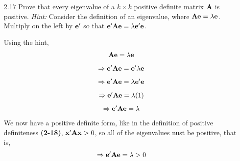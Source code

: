 \begin{enumerate}[font=\bfseries]
        \item[2.17] Prove that every eigenvalue of a $k \times k$ positive definite matrix $\bold{A}$ is positive.
        \newline
        \textit{Hint:} Consider the definition of an eigenvalue, where $\bold{A}\bold{e} = \lambda\bold{e}$. Multiply on the left by
        $\bold{e}^\prime$ so that $\bold{e}^\prime\bold{A}\bold{e} = \lambda\bold{e}^\prime\bold{e}$.
        \par
        Using the hint,
        \[
            \bold{A}\bold{e} = \lambda\bold{e}
        \]
        \[
            \Rightarrow \bold{e}^\prime\bold{A}\bold{e} = \bold{e}^\prime\lambda\bold{e}
        \]
        \[
            \Rightarrow \bold{e}^\prime\bold{A}\bold{e} = \lambda\bold{e}^\prime\bold{e}
        \]
        \[
            \Rightarrow \bold{e}^\prime\bold{A}\bold{e} = \lambda(1)
        \]
        \[
            \Rightarrow \bold{e}^\prime\bold{A}\bold{e} = \lambda
        \]
        We now have a positive definite form, like in the definition of positive definiteness \textbf{(2-18)}, $\bold{x}^\prime\bold{A}\bold{x} > 0$, so all of the eigenvalues nust be positive, that is,
        \[
            \Rightarrow \bold{e}^\prime\bold{A}\bold{e} = \lambda > 0
        \]
        

\end{enumerate}
